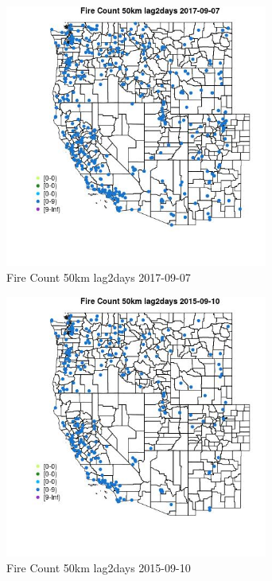 \begin{figure} 
\centering  
\includegraphics[width=0.77\textwidth]{Code_Outputs/Report_ML_input_PM25_Step4_part_e_de_duplicated_aves_compiled_2019-05-21wNAs_MapObsFire_Count_50km_lag2days2017-09-07.jpg} 
\caption{\label{fig:Report_ML_input_PM25_Step4_part_e_de_duplicated_aves_compiled_2019-05-21wNAsMapObsFire_Count_50km_lag2days2017-09-07}Fire Count 50km lag2days 2017-09-07} 
\end{figure} 
 

\begin{figure} 
\centering  
\includegraphics[width=0.77\textwidth]{Code_Outputs/Report_ML_input_PM25_Step4_part_e_de_duplicated_aves_compiled_2019-05-21wNAs_MapObsFire_Count_50km_lag2days2015-09-10.jpg} 
\caption{\label{fig:Report_ML_input_PM25_Step4_part_e_de_duplicated_aves_compiled_2019-05-21wNAsMapObsFire_Count_50km_lag2days2015-09-10}Fire Count 50km lag2days 2015-09-10} 
\end{figure} 
 

